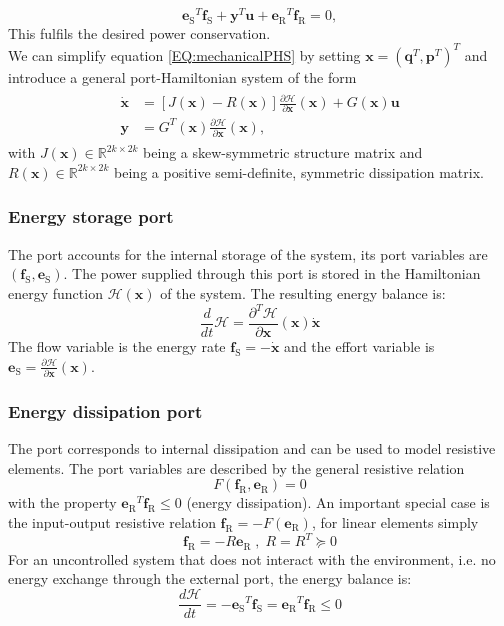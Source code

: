 \documentclass[a4paper,twoside, openright,12pt]{report}
\newcommand{\f}[1]{\boldsymbol{#1}}
\newcommand{\g}[1]{\text{#1}}
\begin{document}
{\begin{equation}
{\f{e}_\g{S}}^T\f{f}_\g{S} + {\f{y}}^T\f{u} + {\f{e}_\g{R}}^T\f{f}_\g{R} = 0,
\end{equation}
This fulfils the desired power conservation.\\
We can simplify equation \ref{EQ:mechanicalPHS} by setting $\f{x} = (\f{q}^T,\f{p}^T)^T$ and introduce a general port-Hamiltonian system of the form
\begin{eqnarray}\label{EQ:generalPHS}
\begin{aligned}
\dot{\f{x}} &= [J(\f{x})-R(\f{x})]\frac{\partial \mathcal{H}}{\partial \f{x}}(\f{x}) + G(\f{x})\f{u}\\
\f{y} &= G^T(\f{x})\frac{\partial \mathcal{H}}{\partial \f{x}}(\f{x}),
\end{aligned}
\end{eqnarray}
with $J(\f{x}) \in \mathbb{R}^{2k \times 2k}$ being a skew-symmetric structure matrix and $R(\f{x})  \in  \mathbb{R}^{2k \times 2k}$ being a positive semi-definite, symmetric dissipation matrix.

\subsubsection{Energy storage port}
The port accounts for the internal storage of the system, its port variables are $ (\f{f}_\g{S},\f{e}_\g{S}) $. The power supplied through this port is stored in the Hamiltonian energy function $\mathcal{H}(\f{x})$ of the system. The resulting energy balance is:
\begin{equation}\label{EQ:storageport}
	\frac{d}{dt}\mathcal{H} = \frac{\partial^T \mathcal{H}}{\partial \f{x}}(\f{x}) \dot{\f{x}}
\end{equation}
The flow variable is the energy rate $ \f{f}_\g{S} = -\dot{\f{x}} $ and the effort variable is $ \f{e}_\g{S} = \frac{\partial \mathcal{H}}{\partial \f{x}}(\f{x}) $.

\subsubsection{Energy dissipation port}
The port corresponds to internal dissipation and can be used to model resistive elements. The port variables are described by the general resistive relation
\begin{equation}
	F(\f{f}_\g{R},\f{e}_\g{R})=0
\end{equation}
with the property  $ {\f{e}_\g{R}}^T  \f{f}_\g{R} \leq 0 $ (energy dissipation). An important special case is the input-output resistive relation $\f{f}_\g{R} = -F(\f{e}_\g{R})$, for linear elements simply
\begin{equation}
\f{f}_\g{R} = -R\f{e}_\g{R} \; , \; R=R^T \succeq 0
\end{equation}
For an uncontrolled system that does not interact with the environment, i.e. no energy exchange through the  external port, the energy balance is:
\begin{equation}
	\frac{d\mathcal{H}}{dt} = -{\f{e}_\g{S}}^T \f{f}_\g{S} = {\f{e}_\g{R}}^T \f{f}_\g{R} \leq 0
\end{equation}

}
\end{document}
